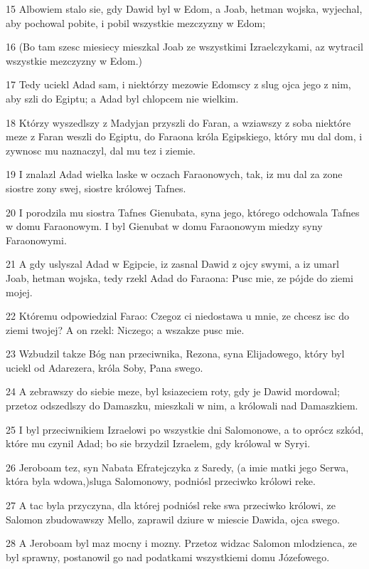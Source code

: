 \par 15 Albowiem stalo sie, gdy Dawid byl w Edom, a Joab, hetman wojska, wyjechal, aby pochowal pobite, i pobil wszystkie mezczyzny w Edom;
\par 16 (Bo tam szesc miesiecy mieszkal Joab ze wszystkimi Izraelczykami, az wytracil wszystkie mezczyzny w Edom.)
\par 17 Tedy uciekl Adad sam, i niektórzy mezowie Edomscy z slug ojca jego z nim, aby szli do Egiptu; a Adad byl chlopcem nie wielkim.
\par 18 Którzy wyszedlszy z Madyjan przyszli do Faran, a wziawszy z soba niektóre meze z Faran weszli do Egiptu, do Faraona króla Egipskiego, który mu dal dom, i zywnosc mu naznaczyl, dal mu tez i ziemie.
\par 19 I znalazl Adad wielka laske w oczach Faraonowych, tak, iz mu dal za zone siostre zony swej, siostre królowej Tafnes.
\par 20 I porodzila mu siostra Tafnes Gienubata, syna jego, którego odchowala Tafnes w domu Faraonowym. I byl Gienubat w domu Faraonowym miedzy syny Faraonowymi.
\par 21 A gdy uslyszal Adad w Egipcie, iz zasnal Dawid z ojcy swymi, a iz umarl Joab, hetman wojska, tedy rzekl Adad do Faraona: Pusc mie, ze pójde do ziemi mojej.
\par 22 Któremu odpowiedzial Farao: Czegoz ci niedostawa u mnie, ze chcesz isc do ziemi twojej? A on rzekl: Niczego; a wszakze pusc mie.
\par 23 Wzbudzil takze Bóg nan przeciwnika, Rezona, syna Elijadowego, który byl uciekl od Adarezera, króla Soby, Pana swego.
\par 24 A zebrawszy do siebie meze, byl ksiazeciem roty, gdy je Dawid mordowal; przetoz odszedlszy do Damaszku, mieszkali w nim, a królowali nad Damaszkiem.
\par 25 I byl przeciwnikiem Izraelowi po wszystkie dni Salomonowe, a to oprócz szkód, które mu czynil Adad; bo sie brzydzil Izraelem, gdy królowal w Syryi.
\par 26 Jeroboam tez, syn Nabata Efratejczyka z Saredy, (a imie matki jego Serwa, która byla wdowa,)sluga Salomonowy, podniósl przeciwko królowi reke.
\par 27 A tac byla przyczyna, dla której podniósl reke swa przeciwko królowi, ze Salomon zbudowawszy Mello, zaprawil dziure w miescie Dawida, ojca swego.
\par 28 A Jeroboam byl maz mocny i mozny. Przetoz widzac Salomon mlodzienca, ze byl sprawny, postanowil go nad podatkami wszystkiemi domu Józefowego.

